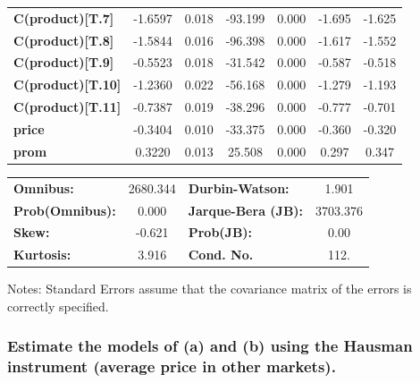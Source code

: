\documentclass[11pt]{article}
\begin{document}
\begin{center}
\begin{tabular}{lcccccc}
\textbf{C(product)[T.7]}  &      -1.6597  &        0.018     &   -93.199  &         0.000        &       -1.695    &       -1.625     \\
\textbf{C(product)[T.8]}  &      -1.5844  &        0.016     &   -96.398  &         0.000        &       -1.617    &       -1.552     \\
\textbf{C(product)[T.9]}  &      -0.5523  &        0.018     &   -31.542  &         0.000        &       -0.587    &       -0.518     \\
\textbf{C(product)[T.10]} &      -1.2360  &        0.022     &   -56.168  &         0.000        &       -1.279    &       -1.193     \\
\textbf{C(product)[T.11]} &      -0.7387  &        0.019     &   -38.296  &         0.000        &       -0.777    &       -0.701     \\
\textbf{price}            &      -0.3404  &        0.010     &   -33.375  &         0.000        &       -0.360    &       -0.320     \\
\textbf{prom}             &       0.3220  &        0.013     &    25.508  &         0.000        &        0.297    &        0.347     \\
\bottomrule
\end{tabular}
\begin{tabular}{lclc}
\textbf{Omnibus:}       & 2680.344 & \textbf{  Durbin-Watson:     } &    1.901  \\
\textbf{Prob(Omnibus):} &   0.000  & \textbf{  Jarque-Bera (JB):  } & 3703.376  \\
\textbf{Skew:}          &  -0.621  & \textbf{  Prob(JB):          } &     0.00  \\
\textbf{Kurtosis:}      &   3.916  & \textbf{  Cond. No.          } &     112.  \\
\bottomrule
\end{tabular}
\end{center}

Notes: \newline
 [1] Standard Errors assume that the covariance matrix of the errors is correctly specified.

    

    \subsubsection{Estimate the models of (a) and (b) using the Hausman
instrument (average price in other
markets).}\label{estimate-the-models-of-a-and-b-using-the-hausman-instrument-average-price-in-other-markets.}
\end{document}
